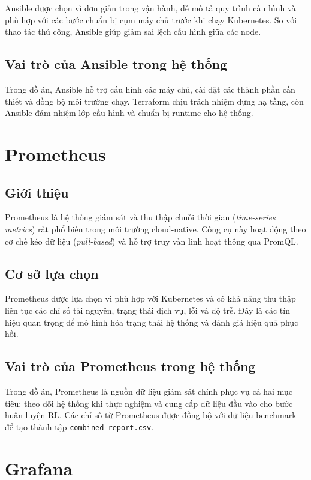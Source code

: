 Ansible được chọn vì đơn giản trong vận hành, dễ mô tả quy trình cấu hình và phù hợp với các bước chuẩn bị cụm máy chủ trước khi chạy Kubernetes. So với thao tác thủ công, Ansible giúp giảm sai lệch cấu hình giữa các node.

\subsection{Vai trò của Ansible trong hệ thống}

Trong đồ án, Ansible hỗ trợ cấu hình các máy chủ, cài đặt các thành phần cần thiết và đồng bộ môi trường chạy. Terraform chịu trách nhiệm dựng hạ tầng, còn Ansible đảm nhiệm lớp cấu hình và chuẩn bị runtime cho hệ thống.

\section{Prometheus}

\subsection{Giới thiệu}

Prometheus là hệ thống giám sát và thu thập chuỗi thời gian (\textit{time-series metrics}) rất phổ biến trong môi trường cloud-native. Công cụ này hoạt động theo cơ chế kéo dữ liệu (\textit{pull-based}) và hỗ trợ truy vấn linh hoạt thông qua PromQL.

\subsection{Cơ sở lựa chọn}

Prometheus được lựa chọn vì phù hợp với Kubernetes và có khả năng thu thập liên tục các chỉ số tài nguyên, trạng thái dịch vụ, lỗi và độ trễ. Đây là các tín hiệu quan trọng để mô hình hóa trạng thái hệ thống và đánh giá hiệu quả phục hồi.

\subsection{Vai trò của Prometheus trong hệ thống}

Trong đồ án, Prometheus là nguồn dữ liệu giám sát chính phục vụ cả hai mục tiêu: theo dõi hệ thống khi thực nghiệm và cung cấp dữ liệu đầu vào cho bước huấn luyện RL. Các chỉ số từ Prometheus được đồng bộ với dữ liệu benchmark để tạo thành tập \texttt{combined-report.csv}.

\section{Grafana}

